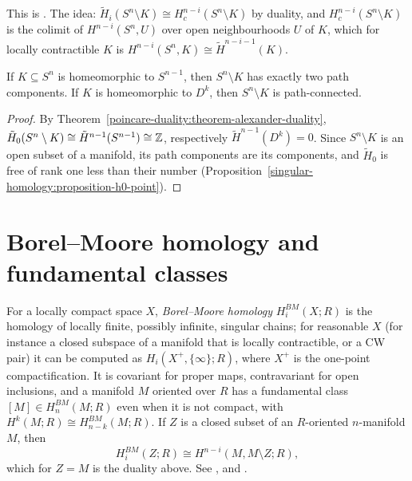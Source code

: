 This is \cite[Theorem 3.44]{hatcher-at}. The idea: $\tilde{H}_i(S^n \setminus K) \cong H^{n-i}_c(S^n \setminus K)$ by duality, and $H^{n-i}_c(S^n \setminus K)$ is the colimit of
$H^{n-i}(S^n, U)$ over open neighbourhoods $U$ of $K$, which for locally contractible $K$ is $H^{n-i}(S^n, K) \cong \tilde{H}^{n-i-1}(K)$.

\begin{corollary}\label{poincare-duality:corollary-jordan-brouwer}
If $K \subseteq S^n$ is homeomorphic to $S^{n-1}$, then $S^n \setminus K$ has exactly two path components. If $K$ is homeomorphic to $D^k$, then $S^n \setminus K$ is path-connected.
\end{corollary}

\begin{proof}
By Theorem~\ref{poincare-duality:theorem-alexander-duality}, $\tilde{H}_0(S^n \setminus K) \cong \tilde{H}^{n-1}(S^{n-1}) \cong \mathbb{Z}$, respectively $\tilde{H}^{n-1}(D^k) = 0$. Since $S^n \setminus K$ is
an open subset of a manifold, its path components are its components, and $\tilde{H}_0$ is free of rank one less than their number
(Proposition~\ref{singular-homology:proposition-h0-point}).
\end{proof}

\section{Borel--Moore homology and fundamental classes}\label{poincare-duality:section-borel-moore}

\begin{remark}\label{poincare-duality:remark-borel-moore}
For a locally compact space $X$, \emph{Borel--Moore homology} $H^{BM}_i(X; R)$ is the homology of locally finite, possibly infinite, singular chains; for reasonable $X$ (for
instance a closed subspace of a manifold that is locally contractible, or a CW pair) it can be computed as $H_i(X^+, \{\infty\}; R)$, where $X^+$ is the one-point
compactification. It is covariant for proper maps, contravariant for open inclusions, and a manifold $M$ oriented over $R$ has a fundamental class $[M] \in H^{BM}_n(M; R)$ even
when it is not compact, with $H^k(M; R) \cong H^{BM}_{n-k}(M; R)$. If $Z$ is a closed subset of an $R$-oriented $n$-manifold $M$, then
\[
H^{BM}_i(Z; R) \cong H^{n-i}(M, M \setminus Z; R),
\]
which for $Z = M$ is the duality above. See \cite[Chapter V]{bredon-sheaf}, \cite{iversen-sheaves} and \cite[Chapter 19]{fulton-intersection}.
\end{remark}

